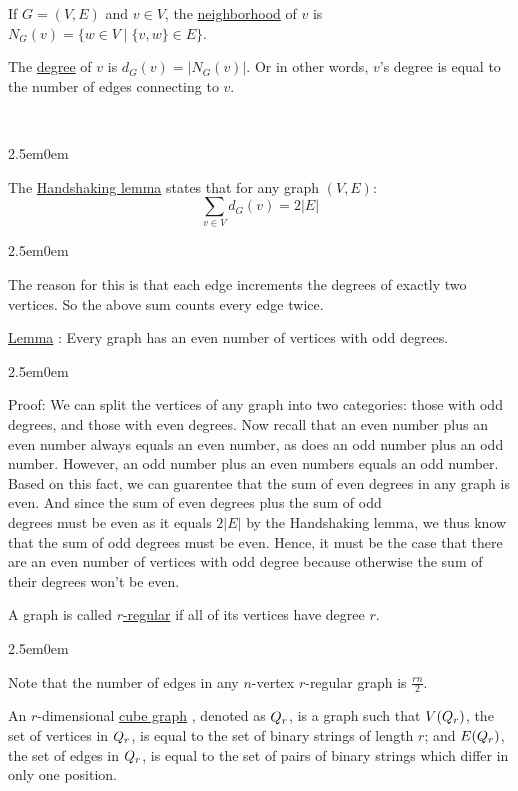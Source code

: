\documentclass{book}
\newcommand{\hOne}{%
   \color{Black}%
   \fontsize{14}{14}\selectfont%
}
\newcommand{\hTwo}{%
   \color{MidnightBlue}%
   \fontsize{13}{13}%
}
\newcommand{\hThree}{%
   \color{PineGreen}
   \fontsize{13}{13}
}
\newenvironment{myIndent}{%
   \begin{adjustwidth}{2.5em}{0em}%
}{%
   \end{adjustwidth}%
}
\newcommand{\udefine}[1]{%
   \setulcolor{Red}%
   \setul{0.2ex}{0.15ex}%
   \ul{#1}%
}
\newcommand{\uuline}[2][.]{%
   \setulcolor{#1}%
   \setul{0.15ex}{0.1ex}\ul{#2}%
   \setul{0.50ex}{0.1ex}\llap{\ul{#2}}%
}
\newcommand{\mySepTwo}[1]{%
   {\noindent\color{#1}{\rule{16cm}{0.5mm}}}\\%
}
\newcommand{\myRoman}[1]{%
   {\fontfamily{lmr}\selectfont#1}%
}
\begin{document}
\newpage
\hOne
If $G = (V, E)$ and $v \in V$, the \udefine{neighborhood} of $v$ is
$N_{G}(v)=\{w \in V \mid \{v, w\} \in E\}$. \bigbreak

The \udefine{degree} of $v$ is $d_{G}(v) = \lvert N_{G}(v) \rvert$.
Or in other words, $v$'s degree is equal to the number of edges 
connecting to $v$.

\mySepTwo{MidnightBlue}
\hTwo
\begin{myIndent}
   The \udefine{Handshaking lemma} states that for any graph $(V, E)$:
      {\fontsize{16}{15}\selectfont
      \[ \sum_{v \in V} d_{G}(v) = 2 \lvert E \rvert \]}
   
   \hThree
   \begin{myIndent}
      The reason for this is that each edge increments the degrees of
      exactly two vertices. So the above sum counts every edge twice.
      \hfill \bigbreak
   \end{myIndent}

   \hTwo
   \uuline{Lemma}: Every graph has an even number of vertices with odd
   degrees.

   \hThree
   \begin{myIndent}
      Proof: We can split the vertices of any graph into two categories:
      those with odd degrees, and those with even degrees.
      \hfill \bigbreak
      Now recall that an even number plus an even number always equals
      an even number, as does an odd number plus an odd number. However,
      an odd number plus an even numbers equals an odd number. Based on
      this fact, we can guarentee that the sum of even degrees in any
      graph is even. And since the sum of even degrees plus the sum of 
      odd\\ degrees must be even as it equals $2 \lvert E \rvert$ by
      the Handshaking lemma, we thus know that the sum of odd degrees 
      must be even. Hence, it must be the case that there are an even 
      number of vertices with odd degree because otherwise the sum of 
      their degrees won't be even.
      \hfill \bigbreak
   \end{myIndent}

   \hTwo
   A graph is called \udefine{$r$-regular} if all of its vertices have
   degree $r$.
   \hThree
   \begin{myIndent}
      Note that the number of edges in any $n$-vertex $r$-regular graph is
      $ \displaystyle{\frac{rn}{2}}$.
      \hfill \bigbreak
   \end{myIndent}
   
   \hTwo
   An $r$-dimensional \udefine{cube graph}, denoted as $\myRoman{Q}_{r}$,
   is a graph such that $V(\myRoman{Q}_{r})$, the set of vertices in 
   $\myRoman{Q}_{r}$, is equal to the set of binary strings of 
   length $r$; and $E(\myRoman{Q}_{r})$, the set of edges in 
   $\myRoman{Q}_{r}$, is equal to the set of pairs of binary strings
   which differ in only one position.


\end{myIndent}
\end{document}
